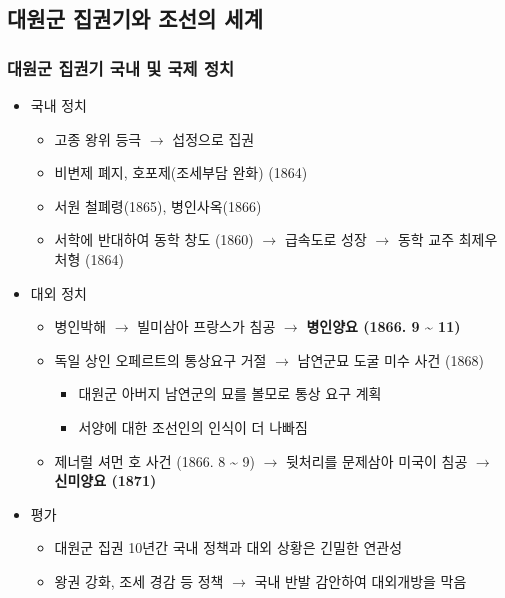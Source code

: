 \subsection{대원군 집권기와 조선의 세계}

\subsubsection*{대원군 집권기 국내 및 국제 정치}
\begin{itemize}
    \item 국내 정치
    \begin{itemize}
        \item 고종 왕위 등극 $\rightarrow$ 섭정으로 집권
        \item 비변제 폐지, 호포제(조세부담 완화) (1864)
        \item 서원 철폐령(1865), 병인사옥(1866)
        \item 서학에 반대하여 동학 창도 (1860) $\rightarrow$ 급속도로 성장 $\rightarrow$ 동학 교주 최제우 처형 (1864)
    \end{itemize}
    \item 대외 정치
    \begin{itemize}
        \item 병인박해 $\rightarrow$ 빌미삼아 프랑스가 침공 $\rightarrow$ \textbf{병인양요 (1866. 9 \textasciitilde{} 11)}
        \item 독일 상인 오페르트의 통상요구 거절 $\rightarrow$ 남연군묘 도굴 미수 사건 (1868)
        \begin{itemize}
            \item 대원군 아버지 남연군의 묘를 볼모로 통상 요구 계획
            \item 서양에 대한 조선인의 인식이 더 나빠짐
        \end{itemize}
        \item 제너럴 셔먼 호 사건 (1866. 8 \textasciitilde{} 9) $\rightarrow$ 뒷처리를 문제삼아 미국이 침공 $\rightarrow$ \textbf{신미양요 (1871)}
    \end{itemize}
    \item 평가
    \begin{itemize}
        \item 대원군 집권 10년간 국내 정책과 대외 상황은 긴밀한 연관성
        \item 왕권 강화, 조세 경감 등 정책 $\rightarrow$ 국내 반발 감안하여 대외개방을 막음
    \end{itemize}
\end{itemize}

